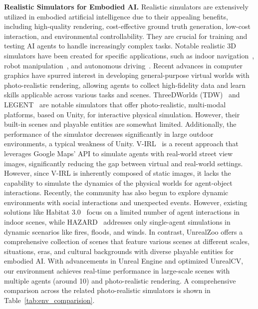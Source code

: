 \documentclass{article}
\begin{document}
\textbf{Realistic Simulators for Embodied AI.}
Realistic simulators are extensively utilized in embodied artificial intelligence due to their appealing benefits, including high-quality rendering, cost-effective ground truth generation, low-cost interaction, and environmental controllability. They are crucial for training and testing AI agents to handle increasingly complex tasks. Notable realistic 3D simulators have been created for specific applications, such as indoor navigation~\citep{kolve2017ai2, puig2018virtualhome, xia2018gibson, house3D}, robot manipulation~\citep{yu2020meta, ehsani2021manipulathor, chen2023bi}, and autonomous driving~\citep{virtual_kitti, airsim,  CARLA}.
Recent advances in computer graphics have spurred interest in developing general-purpose virtual worlds with photo-realistic rendering, allowing agents to collect high-fidelity data and learn skills applicable across various tasks and scenes. ThreeDWorlds (TDW)~\citep{gan2020threedworld} and LEGENT~\citep{cheng2024legent} are notable simulators that offer photo-realistic, multi-modal platforms, based on Unity, for interactive physical simulation. However, their built-in scenes and playable entities are somewhat limited. Additionally, the performance of the simulator decreases significantly in large outdoor environments, a typical weakness of Unity. V-IRL~\citep{yang2024v} is a recent approach that leverages Google Maps' API to simulate agents with real-world street view images, significantly reducing the gap between virtual and real-world settings. However, since V-IRL is inherently composed of static images, it lacks the capability to simulate the dynamics of the physical worlds for agent-object interactions.
Recently, the community has also begun to explore dynamic environments with social interactions and unexpected events. However, existing solutions like Habitat 3.0~\citep{puig2023habitat} focus on a limited number of agent interactions in indoor scenes, while HAZARD~\citep{zhou2024hazard} addresses only single-agent simulations in dynamic scenarios like fires, floods, and winds. In contrast, UnrealZoo offers a comprehensive collection of scenes that feature various scenes at different scales, situations, eras, and cultural backgrounds with diverse playable entities for embodied AI. With advancements in Unreal Engine and optimized UnrealCV, our environment achieves real-time performance in large-scale scenes with multiple agents (around 10) and photo-realistic rendering.
A comprehensive comparison across the related photo-realistic simulators is shown in Table~\ref{tab:env_comparision}.
\end{document}
